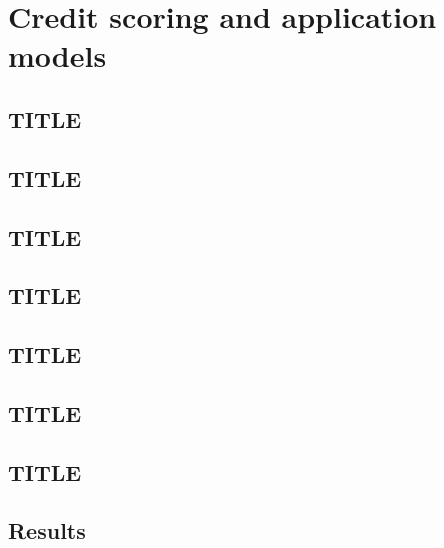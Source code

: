\chapter{Credit scoring and application models}
\label{ch:credit-scoring}


\section{TITLE}
\label{sec:m1}


\section{TITLE}
\label{sec:m2}


\section{TITLE}
\label{sec:m3}


\section{TITLE}
\label{sec:m4}


\section{TITLE}
\label{sec:m5}


\section{TITLE}
\label{sec:m6}


\section{TITLE}
\label{sec:m35}


\section{Results}
\label{sec:results-credit-scoring}

